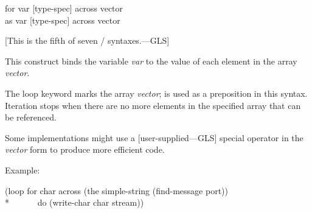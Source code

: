 \begin{defloop}
for var [type-spec] across vector \\
as var [type-spec] across vector

[This is the fifth of seven / syntaxes.---GLS]

    This construct binds the variable \emph{var\/} to
    the value of each element in the array \emph{vector}.

  The loop keyword  marks the array \emph{vector}; 
  is used as a preposition in this syntax.
  Iteration stops when there are no more elements in the specified
  array that can be referenced.

  Some implementations might use a [user-supplied---GLS]  special operator
  in the \emph{vector} form to produce more efficient code.

  Example:
\begin{lisp}
(loop for char across (the simple-string (find-message port)) \\*
~~~~~~do (write-char char stream))
\end{lisp}
\end{defloop}

